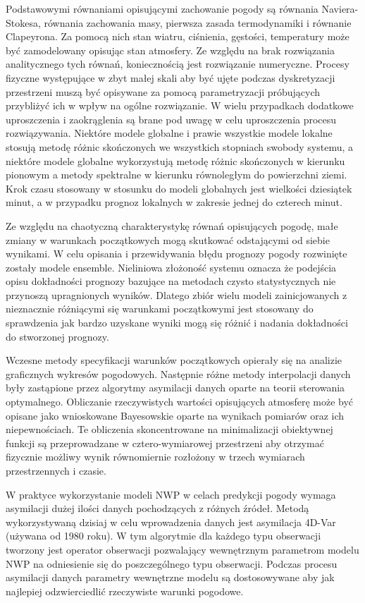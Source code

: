 Podstawowymi równaniami opisującymi zachowanie pogody są równania Naviera-Stokesa, równania zachowania
masy, pierwsza zasada termodynamiki i równanie Clapeyrona. Za pomocą nich stan wiatru, ciśnienia,
gęstości, temperatury może być zamodelowany opisując stan atmosfery. Ze względu na brak rozwiązania
analitycznego tych równań, koniecznością jest rozwiązanie numeryczne. Procesy fizyczne występujące
w zbyt małej skali aby być ujęte podczas dyskretyzacji przestrzeni muszą być opisywane za pomocą
parametryzacji próbujących przybliżyć ich w wpływ na ogólne rozwiązanie. W wielu przypadkach 
dodatkowe uproszczenia i zaokrąglenia są brane pod uwagę w celu uproszczenia procesu
rozwiązywania. Niektóre modele globalne i prawie wszystkie modele lokalne stosują 
metodę różnic skończonych we wszystkich stopniach swobody systemu, a niektóre modele globalne
wykorzystują metodę różnic skończonych w kierunku pionowym a metody spektralne w kierunku równoległym
do powierzchni ziemi. Krok czasu stosowany w stosunku do modeli globalnych jest wielkości dziesiątek
minut, a w przypadku prognoz lokalnych w zakresie jednej do czterech minut.

Ze względu na chaotyczną charakterystykę równań opisujących pogodę, małe zmiany w warunkach początkowych
mogą skutkować odstającymi od siebie wynikami. W celu opisania i przewidywania błędu prognozy pogody 
rozwinięte zostały modele ensemble. Nieliniowa złożoność systemu oznacza że podejścia opisu
dokładności prognozy bazujące na metodach czysto statystycznych nie przynoszą upragnionych wyników.
Dlatego zbiór wielu modeli zainicjowanych z nieznacznie różniącymi się warunkami początkowymi
jest stosowany do sprawdzenia jak bardzo uzyskane wyniki mogą się różnić i nadania dokładności do 
stworzonej prognozy.

Wczesne metody specyfikacji warunków początkowych opierały się na analizie graficznych wykresów 
pogodowych. Następnie różne metody interpolacji danych były zastąpione przez algorytmy
asymilacji danych oparte na teorii sterowania optymalnego. Obliczanie rzeczywistych wartości
opisujących atmosferę może być opisane jako wnioskowane Bayesowskie oparte na wynikach pomiarów
oraz ich niepewnościach. Te obliczenia skoncentrowane na minimalizacji obiektywnej funkcji 
są przeprowadzane w cztero-wymiarowej przestrzeni aby otrzymać fizycznie możliwy wynik
równomiernie rozłożony w trzech wymiarach przestrzennych i czasie.

W praktyce wykorzystanie modeli NWP w celach predykcji pogody wymaga asymilacji dużej ilości
danych pochodzących z różnych źródeł. Metodą wykorzystywaną dzisiaj w celu wprowadzenia
danych jest asymilacja 4D-Var (używana od 1980 roku). W tym algorytmie dla każdego typu obserwacji tworzony jest
operator obserwacji pozwalający wewnętrznym parametrom modelu NWP na odniesienie się
do poszczególnego typu obserwacji. Podczas procesu asymilacji danych parametry wewnętrzne
modelu są dostosowywane aby jak najlepiej odzwierciedlić rzeczywiste warunki pogodowe.

